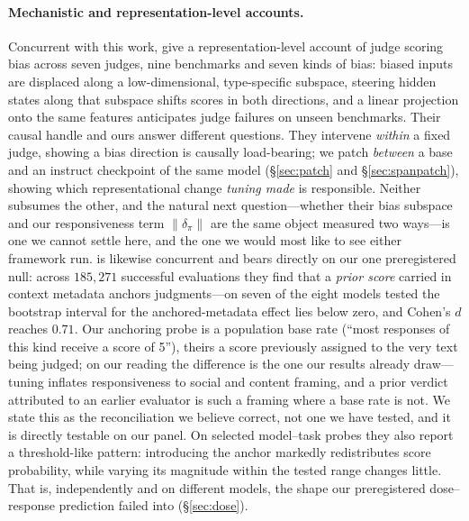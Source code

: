 \documentclass[11pt]{article}
\begin{document}
\paragraph{Mechanistic and representation-level accounts.} Concurrent with this
work, \citet{xu2026inside} give a representation-level account of judge scoring
bias across seven judges, nine benchmarks and seven kinds of bias: biased inputs are
displaced along a low-dimensional, type-specific subspace, steering hidden states
along that subspace shifts scores in both directions, and a linear projection onto
the same features anticipates judge failures on unseen benchmarks. Their causal
handle and ours answer different questions. They intervene \emph{within} a fixed
judge, showing a bias direction is causally load-bearing; we patch \emph{between} a
base and an instruct checkpoint of the same model
(\S\ref{sec:patch} and \S\ref{sec:spanpatch}), showing which representational change
\emph{tuning made} is responsible. Neither subsumes the other, and the natural next
question---whether their bias subspace and our responsiveness term
$\|\delta_\pi\|$ are the same object measured two ways---is one we cannot settle
here, and the one we would most like to see either framework run.
\citet{kapetanovic2026anchoring} is likewise concurrent and bears directly on our
one preregistered null: across $185{,}271$ successful evaluations they find that a
\emph{prior score} carried in context metadata anchors judgments---on seven of the
eight models tested the bootstrap interval for the anchored-metadata effect lies
below zero, and Cohen's $d$ reaches $0.71$. Our anchoring probe is a population
base rate (``most responses of this kind receive a score of 5''), theirs a score
previously assigned to the very text being judged; on our reading the difference is
the one our results already draw---tuning inflates responsiveness to social and
content framing, and a prior verdict attributed to an earlier evaluator is such a
framing where a base rate is not. We state this as the reconciliation we believe
correct, not one we have tested, and it is directly testable on our panel. On
selected model--task probes they also report a threshold-like pattern:
introducing the anchor markedly redistributes score probability, while varying its
magnitude within the tested range changes little. That is, independently and on
different models, the shape our preregistered dose--response prediction failed into
(\S\ref{sec:dose}).
\end{document}
